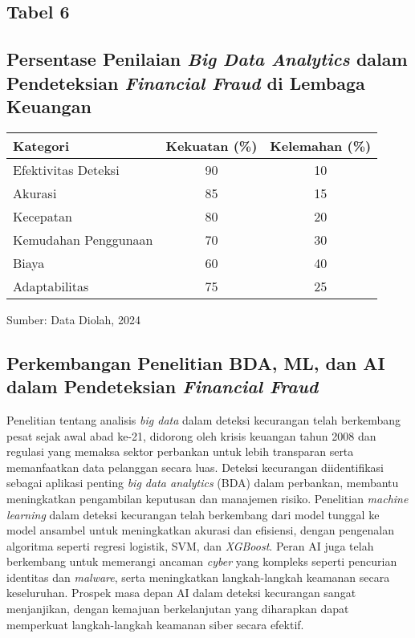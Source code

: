 \documentclass[12pt, a4paper]{article}
\begin{document}
\begin{center}
    \renewcommand{\arraystretch}{1.5}
    \subsection*{Tabel 6}
    \subsection*{Persentase Penilaian \textit{Big Data Analytics} dalam Pendeteksian \textit{Financial Fraud} di Lembaga Keuangan}
    \begin{longtable}{|l|c|c|}
        \hline
        \textbf{Kategori} & \textbf{Kekuatan (\%)} & \textbf{Kelemahan (\%)} \\
        \hline
        Efektivitas Deteksi & 90 & 10 \\
        \hline
        Akurasi & 85 & 15 \\
        \hline
        Kecepatan & 80 & 20 \\
        \hline
        Kemudahan Penggunaan & 70 & 30 \\
        \hline
        Biaya & 60 & 40 \\
        \hline
        Adaptabilitas & 75 & 25 \\
        \hline
    \end{longtable}
\end{center}

\begin{flushleft}
Sumber: Data Diolah, 2024
\end{flushleft}

\subsection*{Perkembangan Penelitian BDA, ML, dan AI dalam Pendeteksian \textit{Financial Fraud}}
\hspace{1cm}Penelitian tentang analisis \textit{big data} dalam deteksi kecurangan telah berkembang pesat sejak awal abad ke-21, didorong oleh krisis keuangan tahun 2008 dan regulasi yang memaksa sektor perbankan untuk lebih transparan serta memanfaatkan data pelanggan secara luas. Deteksi kecurangan diidentifikasi sebagai aplikasi penting \textit{big data analytics} (BDA) dalam perbankan, membantu meningkatkan pengambilan keputusan dan manajemen risiko. 
Penelitian \textit{machine learning} dalam deteksi kecurangan telah berkembang dari model tunggal ke model ansambel untuk meningkatkan akurasi dan efisiensi, dengan pengenalan algoritma seperti regresi logistik, SVM, dan \textit{XGBoost}. Peran AI juga telah berkembang untuk memerangi ancaman \textit{cyber} yang kompleks seperti pencurian identitas dan \textit{malware}, serta meningkatkan langkah-langkah keamanan secara keseluruhan. 
Prospek masa depan AI dalam deteksi kecurangan sangat menjanjikan, dengan kemajuan berkelanjutan yang diharapkan dapat memperkuat langkah-langkah keamanan siber secara efektif.
\end{document}
